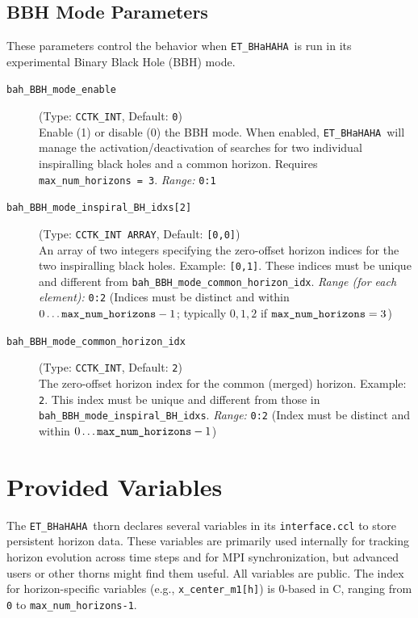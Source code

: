 \documentclass[a4paper,11pt]{article}
\newcommand{\thorn}[1]{{\tt #1}}
\newcommand{\file}[1]{{\tt #1}}
\newcommand{\BHaHAHA}{\thorn{ET\_BHaHAHA}} %
\begin{document}
\subsection{BBH Mode Parameters}
\label{ssec:params_bbh_mode}
These parameters control the behavior when \BHaHAHA\ is run in its experimental Binary Black Hole (BBH) mode.
\begin{description}
    \item[\texttt{bah\_BBH\_mode\_enable}] (Type: \texttt{CCTK\_INT}, Default: \texttt{0}) \\
        Enable (1) or disable (0) the BBH mode. When enabled, \BHaHAHA\ will manage the activation/deactivation of searches for two individual inspiralling black holes and a common horizon.
        Requires \texttt{max\_num\_horizons = 3}.
        \textit{Range:} \texttt{0:1}

    \item[\texttt{bah\_BBH\_mode\_inspiral\_BH\_idxs[2]}] (Type: \texttt{CCTK\_INT ARRAY}, Default: \texttt{[0,0]}) \\
        An array of two integers specifying the zero-offset horizon indices for the two inspiralling black holes. Example: \texttt{[0,1]}. These indices must be unique and different from \texttt{bah\_BBH\_mode\_common\_horizon\_idx}.
        \textit{Range (for each element):} \texttt{0:2} (Indices must be distinct and within $0 \dots \text{\texttt{max\_num\_horizons}}-1$; typically $0,1,2$ if $\text{\texttt{max\_num\_horizons}}=3$)

    \item[\texttt{bah\_BBH\_mode\_common\_horizon\_idx}] (Type: \texttt{CCTK\_INT}, Default: \texttt{2}) \\
        The zero-offset horizon index for the common (merged) horizon. Example: \texttt{2}. This index must be unique and different from those in \texttt{bah\_BBH\_mode\_inspiral\_BH\_idxs}.
        \textit{Range:} \texttt{0:2} (Index must be distinct and within $0 \dots \text{\texttt{max\_num\_horizons}}-1$)
\end{description}

\section{Provided Variables}
\label{sec:variables}
The \BHaHAHA\ thorn declares several variables in its \file{interface.ccl} to store persistent horizon data. These variables are primarily used internally for tracking horizon evolution across time steps and for MPI synchronization, but advanced users or other thorns might find them useful. All variables are public. The index for horizon-specific variables (e.g., \texttt{x\_center\_m1[h]}) is 0-based in C, ranging from \texttt{0} to \texttt{max\_num\_horizons-1}.
\end{document}
